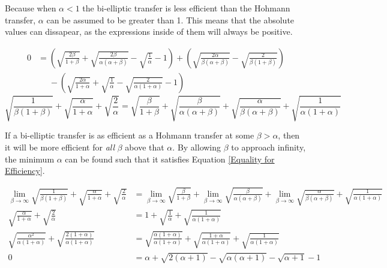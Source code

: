 \documentclass{article}
\begin{document}
Because when $\alpha<1$ the bi-elliptic transfer is less efficient than the Hohmann transfer, $\alpha$ can be assumed to be greater than 1. This means that the absolute values can dissapear, as the expressions inside of them will always be positive.

\begin{align*}
    0 & =\left(\sqrt{\frac{2\beta}{1+\beta}}+\sqrt{\frac{2\beta}{\alpha(\alpha+\beta)}}-\sqrt{\frac{1}{\alpha}}-1\right)+\left(\sqrt{\frac{2\alpha}{\beta(\alpha+\beta)}}-\sqrt{\frac{2}{\beta(1+\beta)}}\right) \\
      & \phantom{=}-\left(\sqrt{\frac{2\alpha}{1+\alpha}}+\sqrt{\frac{1}{\alpha}}-\sqrt{\frac{2}{\alpha(1+\alpha)}}-1\right)
\end{align*}
\begin{equation}\label{Equality for Efficiency}
    \sqrt{\frac{1}{\beta(1+\beta)}}+\sqrt{\frac{\alpha}{1+\alpha}}+\sqrt{\frac{2}{\alpha}}=\sqrt{\frac{\beta}{1+\beta}}+\sqrt{\frac{\beta}{\alpha(\alpha+\beta)}}+\sqrt{\frac{\alpha}{\beta(\alpha+\beta)}}+\sqrt{\frac{1}{\alpha(1+\alpha)}}
\end{equation}

If a bi-elliptic transfer is as efficient as a Hohmann transfer at some $\beta>\alpha$, then it will be more efficient for \textit{all} $\beta$ above that $\alpha$. By allowing $\beta$ to approach infinity, the minimum $\alpha$ can be found such that it satisfies Equation \eqref{Equality for Efficiency}.

\begin{align*}
    \lim_{\beta\rightarrow\infty}\sqrt{\frac{1}{\beta(1+\beta)}}+\sqrt{\frac{\alpha}{1+\alpha}}+\sqrt{\frac{2}{\alpha}} & =\lim_{\beta\rightarrow\infty}\sqrt{\frac{\beta}{1+\beta}}+\lim_{\beta\rightarrow\infty}\sqrt{\frac{\beta}{\alpha(\alpha+\beta)}}+\lim_{\beta\rightarrow\infty}\sqrt{\frac{\alpha}{\beta(\alpha+\beta)}}+\sqrt{\frac{1}{\alpha(1+\alpha)}} \\
    \sqrt{\frac{\alpha}{1+\alpha}}+\sqrt{\frac{2}{\alpha}}                                                              & =1+\sqrt{\frac{1}{\alpha}}+\sqrt{\frac{1}{\alpha(1+\alpha)}}                                                                                                                                                                               \\
    \sqrt{\frac{\alpha^2}{\alpha(1+\alpha)}}+\sqrt{\frac{2(1+\alpha)}{\alpha(1+\alpha)}}                                & =\sqrt{\frac{\alpha(1+\alpha)}{\alpha(1+\alpha)}}+\sqrt{\frac{1+\alpha}{\alpha(1+\alpha)}}+\sqrt{\frac{1}{\alpha(1+\alpha)}}                                                                                                               \\
    0                                                                                                                   & =\alpha+\sqrt{2(\alpha+1)}-\sqrt{\alpha(\alpha+1)}-\sqrt{\alpha+1}-1
\end{align*}
\end{document}
